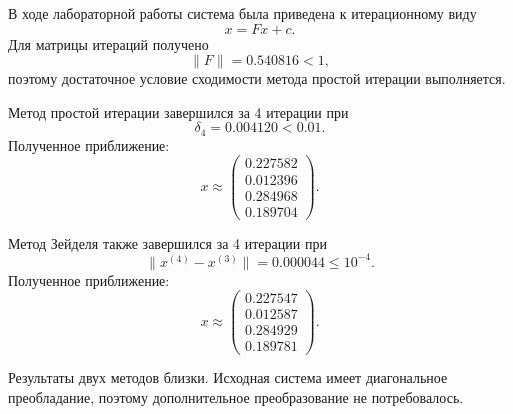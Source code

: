 В ходе лабораторной работы система была приведена к итерационному виду
\[
    x = Fx + c.
\]
Для матрицы итераций получено
\[
    \|F\| = 0.540816 < 1,
\]
поэтому достаточное условие сходимости метода простой итерации выполняется.

Метод простой итерации завершился за 4 итерации при
\[
    \delta_4 = 0.004120 < 0.01.
\]
Полученное приближение:
\[
    x \approx
    \begin{pmatrix}
    0.227582 \\
    0.012396 \\
    0.284968 \\
    0.189704
    \end{pmatrix}.
\]

Метод Зейделя также завершился за 4 итерации при
\[
    \|x^{(4)} - x^{(3)}\| = 0.000044 \le 10^{-4}.
\]
Полученное приближение:
\[
    x \approx
    \begin{pmatrix}
    0.227547 \\
    0.012587 \\
    0.284929 \\
    0.189781
    \end{pmatrix}.
\]

Результаты двух методов близки. Исходная система имеет диагональное преобладание, поэтому дополнительное преобразование не потребовалось.